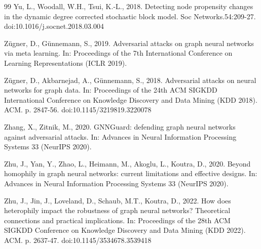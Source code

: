 \documentclass[preprint,12pt,authoryear]{elsarticle}
\theoremstyle{definition}
\begin{document}
\begin{thebibliography}{99}
Yu, L., Woodall, W.H., Tsui, K.-L., 2018. Detecting node propensity changes in the dynamic degree corrected stochastic block model. Soc Networks.54:209-27. doi:10.1016/j.socnet.2018.03.004

Z\"ugner, D., G\"unnemann, S., 2019. Adversarial attacks on graph neural networks via meta learning. In: Proceedings of the 7th International Conference on Learning Representations (ICLR 2019).

Z\"ugner, D., Akbarnejad, A., G\"unnemann, S., 2018. Adversarial attacks on neural networks for graph data. In: Proceedings of the 24th ACM SIGKDD International Conference on Knowledge Discovery and Data Mining (KDD 2018). ACM. p. 2847-56. doi:10.1145/3219819.3220078

Zhang, X., Zitnik, M., 2020. GNNGuard: defending graph neural networks against adversarial attacks. In: Advances in Neural Information Processing Systems 33 (NeurIPS 2020).

Zhu, J., Yan, Y., Zhao, L., Heimann, M., Akoglu, L., Koutra, D., 2020. Beyond homophily in graph neural networks: current limitations and effective designs. In: Advances in Neural Information Processing Systems 33 (NeurIPS 2020).

Zhu, J., Jin, J., Loveland, D., Schaub, M.T., Koutra, D., 2022. How does heterophily impact the robustness of graph neural networks? Theoretical connections and practical implications. In: Proceedings of the 28th ACM SIGKDD Conference on Knowledge Discovery and Data Mining (KDD 2022). ACM. p. 2637-47. doi:10.1145/3534678.3539418

\end{thebibliography}


\end{document}
